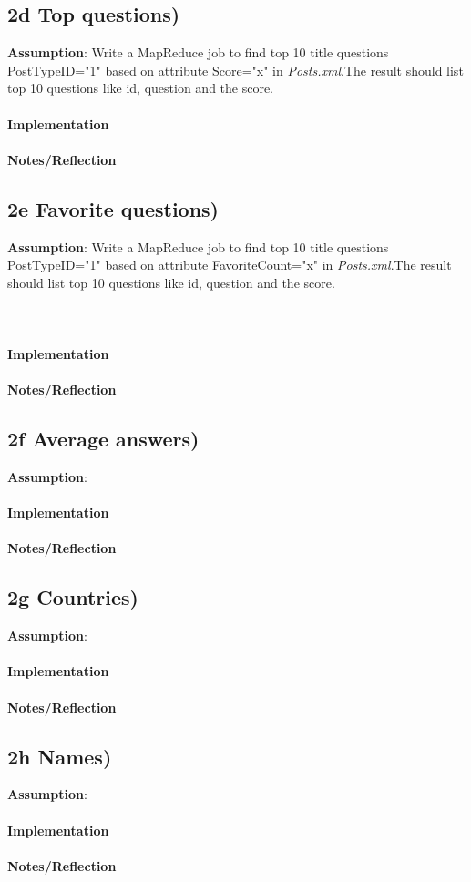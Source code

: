 \documentclass[fleqn,10pt]{wlscirep}
\begin{document}
\subsection*{2d Top questions) }
\textbf{Assumption}: Write a MapReduce job to find top 10 title questions PostTypeID="1"  based on attribute Score="x" in \textit{Posts.xml}.The result should list top 10 questions like id, question and the score.\\ \\
\textbf{Implementation}  \\ \\
\textbf{Notes/Reflection}

\subsection*{2e Favorite questions) }
\textbf{Assumption}: Write a MapReduce job to find top 10 title questions PostTypeID="1"  based on attribute FavoriteCount="x" in \textit{Posts.xml}.The result should list top 10 questions like id, question and the score.\\ \\ \\ \\
\textbf{Implementation}  \\ \\
\textbf{Notes/Reflection}

\subsection*{2f Average answers) }
\textbf{Assumption}:  \\ \\
\textbf{Implementation}  \\ \\
\textbf{Notes/Reflection}

\subsection*{2g Countries) }
\textbf{Assumption}:  \\ \\
\textbf{Implementation}  \\ \\
\textbf{Notes/Reflection}

\subsection*{2h Names) }
\textbf{Assumption}:  \\ \\
\textbf{Implementation}  \\ \\
\textbf{Notes/Reflection}
\end{document}
